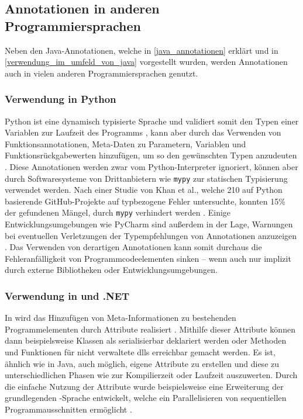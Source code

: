 \subsection{Annotationen in anderen Programmiersprachen}
Neben den Java-Annotationen, welche in \autoref{java_annotationen} erklärt und in \autoref{verwendung_im_umfeld_von_java} vorgestellt wurden, werden Annotationen auch in vielen anderen Programmiersprachen genutzt. 
\subsubsection{Verwendung in Python}
\label{verwendung_in_python}
Python ist eine dynamisch typisierte Sprache und validiert somit den Typen einer Variablen zur Laufzeit des Programms \cite{Tratt2009}, kann aber durch das Verwenden von Funktionsannotationen, Meta-Daten zu Parametern, Variablen und Funktionsrückgabewerten hinzufügen, um so den gewünschten Typen anzudeuten \cite{Rossum2014, Winter2006}. Diese Annotationen werden zwar vom Python-Interpreter ignoriert, können aber durch Softwaresysteme von Drittanbietern wie \texttt{mypy} zur statischen Typisierung verwendet werden. Nach einer Studie von Khan et al., welche 210 auf Python basierende GitHub-Projekte auf typbezogene Fehler untersuchte, konnten 15\% der gefundenen Mängel, durch \texttt{mypy} verhindert werden \cite{Khan2021}.
Einige Entwicklungsumgebungen wie PyCharm sind außerdem in der Lage, Warnungen bei eventuellen Verletzungen der Typempfehlungen von Annotationen anzuzeigen \cite{Rother2017}. Das Verwenden von derartigen Annotationen kann somit durchaus die Fehleranfälligkeit von Programmcodeelementen sinken -- wenn auch nur implizit durch externe Bibliotheken oder Entwicklungsumgebungen.
\subsubsection{Verwendung in \texorpdfstring{\csharpbold}{C\#} und .NET}
In \csharp{} wird das Hinzufügen von Meta-Informationen zu bestehenden Programmelementen durch Attribute realisiert \cite{Albahari2019}. Mithilfe dieser Attribute können dann beispielsweise Klassen als serialisierbar deklariert werden oder Methoden und Funktionen für nicht verwaltete \acp{dll} erreichbar gemacht werden. Es ist, ähnlich wie in Java, auch möglich, eigene Attribute zu erstellen und diese zu unterschiedlichen Phasen wie zur Kompilierzeit oder Laufzeit auszuwerten. Durch die einfache Nutzung der Attribute wurde beispielsweise eine Erweiterung der grundlegenden \csharp-Sprache entwickelt, welche ein Parallelisieren von sequentiellen Programmausschnitten ermöglicht \cite{Cazzola2005}. 
\label{verwendung_in_c_sharp_dot_net}
